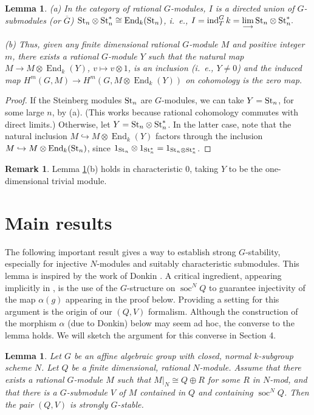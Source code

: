\documentclass[11pt,leqno,amscd,amssymb,verbatim, url]{amsart}
\newtheorem{lem}[thm]{Lemma}
\theoremstyle{definition}
\newtheorem{rem}[thm]{Remark}
\numberwithin{equation}{thm}
\newcommand{\St}{\text{\rm St}}
\newcommand{\End}{\operatorname{End}}
\newcommand{\ind}{\operatorname{ind}}
\newcommand{\soc}{\operatorname{soc}}
\begin{document}
\begin{lem}\label{Steinberg} (a) In the category of rational $G$-modules, $I$ is a directed union of $G$-submodules
(or $\overline G$)
$\St_n\otimes\St_n^*\cong\End_k(\St_n)$, i.~e.,
$I=\ind_T^Gk=\underset\longrightarrow\lim\,\St_n\otimes\St_n^*.$

(b)
Thus, given any finite dimensional rational $G$-module $M$ and positive integer $m$, there exists a
rational $G$-module $Y$ such that the natural map $M\to M\otimes \End_k(Y)$, $v\mapsto v\otimes 1$,
is an inclusion (i.~e., $Y\not=0$) and the induced map $H^m(G,M)\to H^m(G,M\otimes\End_k(Y))$ on cohomology
is the zero map.
\end{lem}

\begin{proof} If the Steinberg modules $\St_n$ are $G$-modules, we can  take $Y=\St_n$, for some large $n$, by (a). (This works
because rational cohomology commutes with direct limits.) Otherwise, let $Y=\St_n\otimes\St_n^*$. In the latter case, note
that  the
natural inclusion $M\hookrightarrow M\otimes\End_k(Y)$ factors through the inclusion $M\hookrightarrow M\otimes \End_k(\St_n)$,
since $1_{\St_n}\otimes 1_{\St_n^*}=1_{\St_n\otimes \St_n^*}$.
\end{proof}

\begin{rem}\label{charzero} Lemma \ref{Steinberg}(b) holds in characteristic 0, taking $Y$ to be the one-dimensional
trivial module.\end{rem}

\section{Main results}
  The following important result gives a way to establish strong
$G$-stability, especially for injective $N$-modules and suitably
characteristic submodules. This lemma is inspired by the work of Donkin \cite{Donkin1}. A critical ingredient,
appearing implicitly in \cite{Donkin1}, is the use of the $G$-structure on $\soc^NQ$ to guarantee injectivity of the
 map $\alpha(g)$ appearing in the proof below. Providing a setting for this argument is the origin of our $(Q,V)$ formalism. Although the construction
 of the morphism $\alpha$ (due to Donkin) below may seem ad hoc, the converse to the lemma holds.  We will sketch
the argument for this converse in Section 4.

\begin{lem}\label{biglemma}Let $G$ be an affine algebraic group with closed, normal $k$-subgroup scheme $N$. Let $Q$ be a finite dimensional, rational $N$-module. Assume that there exists a rational $G$-module $M$ such that $M|_N\cong Q\oplus R$ for some $R$ in $N$-mod, and that there is a $G$-submodule
$V$ of $M$ contained in $Q$ and containing $\soc^NQ$. Then the pair $(Q,V)$ is strongly $G$-stable.  \end{lem}
\end{document}
